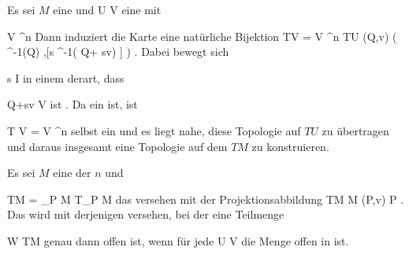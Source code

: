 {





Es sei $M$ eine
und
\maabbdisp {\alpha} { U } { V
} {}
eine
mit

\mavergleichskette
{\vergleichskette
{ V
}
{ \subseteq }{ \R^n
}
{  }{
}
{    }{
}
{   }{
}
}
{}{}{}
Dann induziert die Karte eine natürliche Bijektion
 {TV =  V \times \R^n } { TU
} {(Q,v)} { \left(  \alpha^{-1}(Q) ,[s \mapsto \alpha^{-1}( Q+ sv) ]  \right)
} {.}
Dabei bewegt sich

\mavergleichskette
{\vergleichskette
{ s
}
{ \in }{ I
}
{  }{
}
{    }{
}
{   }{
}
}
{}{}{}
in einem
derart, dass

\mavergleichskette
{\vergleichskette
{ Q+sv
}
{ \in }{ V
}
{  }{
}
{    }{
}
{   }{
}
}
{}{}{}
ist
 {} {.}
Da
 ein
ist, ist

\mavergleichskette
{\vergleichskette
{ T V
}
{ = }{ V \times \R^n
}
{  }{
}
{    }{
}
{   }{
}
}
{}{}{}
selbst ein
und es liegt nahe, diese Topologie auf $TU$ zu übertragen und daraus insgesamt eine Topologie auf dem
$TM$ zu konstruieren.





}


{}
{





Es sei $M$ eine
der
$n$ und

\mavergleichskettedisp
{\vergleichskette
{ TM
}
{ =} {\biguplus_{P \in M} T_P M
}
{ } {
}
{ } {
}
{ } {
}
}
{}{}{}
das
versehen mit der Projektionsabbildung
\maabbeledisp {\pi} { TM } { M
} { (P,v) } { P
} {.}
Das  wird mit derjenigen
versehen, bei der eine Teilmenge

\mavergleichskette
{\vergleichskette
{ W
}
{ \subseteq }{ TM
}
{  }{
}
{    }{
}
{   }{
}
}
{}{}{}
genau dann offen ist, wenn für jede
\maabbdisp {\alpha} { U } { V
} {}
die Menge
 offen in
 ist.





}

